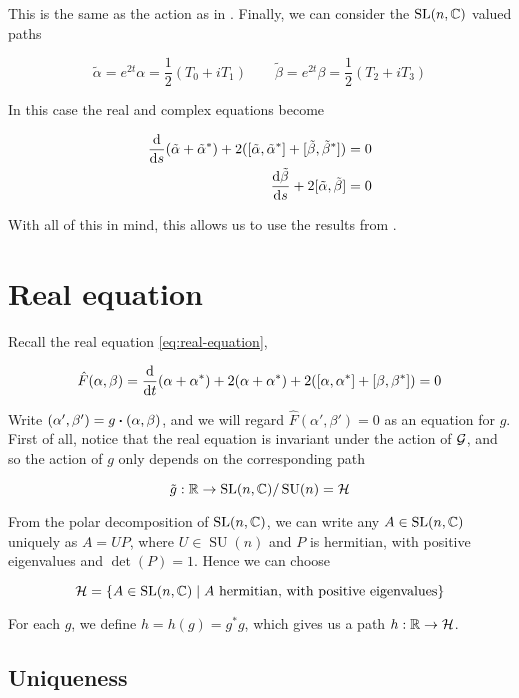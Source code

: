 \documentclass{report}
\DeclareMathOperator{\SU}{SU}
\begin{document}
This is the same as the action as in \cite[Equation 1.6]{donaldson_nahms_1984}. Finally, we can consider the \(\operatorname{SL}(n, \mathbb{C})\) valued paths

\[\tilde\alpha = e^{2t}\alpha = \frac{1}{2}(T_0 + iT_1) \qquad \tilde\beta = e^{2t}\beta = \frac12(T_2 + iT_3)\]

In this case the real and complex equations become

\begin{align}
    \label{eq:nahm-real-equation}
    \dv{s}(\tilde\alpha + \tilde\alpha^*) + 2([\tilde\alpha, \tilde\alpha^*] + [\tilde\beta, \tilde\beta^*]) &= 0 \\
    \dv{\tilde\beta}{s} + 2[\tilde\alpha, \tilde\beta] &= 0 \nonumber
\end{align}

With all of this in mind, this allows us to use the results from \cite{donaldson_nahms_1984}.

\section{Real equation}

Recall the real equation \cref{eq:real-equation},

\[\hat F(\alpha, \beta) = \dv{t}(\alpha + \alpha^*) + 2(\alpha + \alpha^*) + 2([\alpha, \alpha^*] + [\beta, \beta^*]) = 0\]

Write \((\alpha', \beta') = g \vdot (\alpha, \beta)\), and we will regard \(\hat F(\alpha', \beta') = 0\) as an equation for \(g\). First of all, notice that the real equation is invariant under the action of \(\mathcal{G}\), and so the action of \(g\) only depends on the corresponding path

\[\tilde g : \R \to \SL(n, \C) / \SU(n) = \mcH\]

From the polar decomposition of \(\operatorname{SL}(n, \mathbb{C})\), we can write any \(A \in \operatorname{SL}(n, \mathbb{C})\) uniquely as \(A = UP\), where \(U \in \SU(n)\) and \(P\) is hermitian, with positive eigenvalues and \(\det(P) = 1\). Hence we can choose

\[\mathcal{H} = \left\{A \in \operatorname{SL}(n, \mathbb{C}) \mid A \text{ hermitian, with positive eigenvalues}\right\}\]

For each \(g\), we define \(h = h(g) = g^*g\), which gives us a path \(h : \mathbb{R} \to \mathcal{H}\).

\subsection{Uniqueness}
\end{document}
